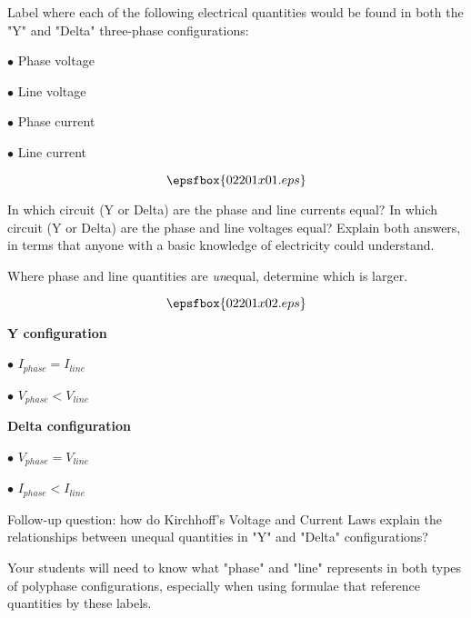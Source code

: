 

Label where each of the following electrical quantities would be found in both the "Y" and "Delta" three-phase configurations:

\medskip
\goodbreak
\item{$\bullet$} Phase voltage
\item{$\bullet$} Line voltage
\item{$\bullet$} Phase current
\item{$\bullet$} Line current
\medskip

$$\epsfbox{02201x01.eps}$$

In which circuit (Y or Delta) are the phase and line currents equal?  In which circuit (Y or Delta) are the phase and line voltages equal?  Explain both answers, in terms that anyone with a basic knowledge of electricity could understand.

Where phase and line quantities are {\it un}equal, determine which is larger.







$$\epsfbox{02201x02.eps}$$

\medskip
\goodbreak
\item{} {\bf Y configuration} 
\item{$\bullet$} $I_{phase} = I_{line}$
\item{$\bullet$} $V_{phase} < V_{line}$ 
\medskip

\medskip
\goodbreak
\item{} {\bf Delta configuration} 
\item{$\bullet$} $V_{phase} = V_{line}$ 
\item{$\bullet$} $I_{phase} < I_{line}$
\medskip

\vskip 10pt

Follow-up question: how do Kirchhoff's Voltage and Current Laws explain the relationships between unequal quantities in "Y" and "Delta" configurations?







Your students will need to know what "phase" and "line" represents in both types of polyphase configurations, especially when using formulae that reference quantities by these labels.  




